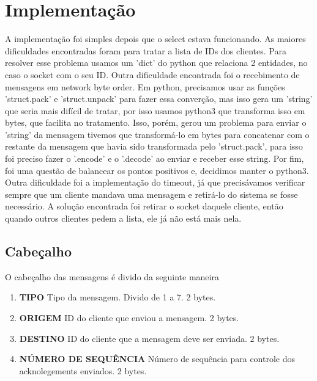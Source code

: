 \documentclass[10pt]{article}
\begin{document}
	\section{Implementação}
	A implementação foi simples depois que o select estava funcionando. As maiores dificuldades encontradas foram para tratar a lista de IDs dos clientes. Para resolver esse problema usamos um 'dict' do python que relaciona 2 entidades, no caso o socket com o seu ID. 
	\newline Outra dificuldade encontrada foi o recebimento de mensagens em network byte order. Em python, precisamos usar as funções 'struct.pack' e 'struct.unpack' para fazer essa converção, mas isso gera um 'string' que seria mais difícil de tratar, por isso usamos python3 que transforma isso em bytes, que facilita no tratamento. Isso, porém, gerou um problema para enviar o 'string' da mensagem tivemos que transformá-lo em bytes para concatenar com o restante da mensagem que havia sido transformada pelo 'struct.pack', para isso foi preciso fazer o '.encode' e o '.decode' ao enviar e receber esse string. Por fim, foi uma questão de balancear os pontos positivos e, decidimos manter o python3.
	\newline Outra dificuldade foi a implementação do timeout, já que precisávamos verificar sempre que um cliente mandava uma mensagem e retirá-lo do sistema se fosse necessário. A solução encontrada foi retirar o socket daquele cliente, então quando outros clientes pedem a lista, ele já não está mais nela.
	
	\subsection{Cabeçalho}
	O cabeçalho das mensagens é divido da seguinte maneira
	\begin{enumerate}
		\item[]\textbf{TIPO} Tipo da mensagem. Divido de 1 a 7. 2 bytes.
		\item[]\textbf{ORIGEM} ID do cliente que enviou a mensagem. 2 bytes.
		\item[]\textbf{DESTINO} ID do cliente que a mensagem deve ser enviada. 2 bytes.
		\item[]\textbf{NÚMERO DE SEQUÊNCIA} Número de sequência para controle dos acknolegements enviados. 2 bytes.
	\end{enumerate}
\end{document}
